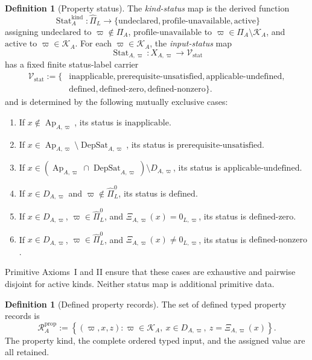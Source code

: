 \documentclass[11pt]{article}
\newcommand{\Pihat}{\widehat{\Pi}_{L}}
\newcommand{\PiZero}{\widehat{\Pi}_{L}^{0}}
\newcommand{\Ap}{\operatorname{Ap}}
\newcommand{\DepSat}{\operatorname{DepSat}}
\newcommand{\Stat}{\operatorname{Stat}}
\newcommand{\PropRec}{\mathcal R^{\mathrm{prop}}}
\theoremstyle{definition}
\newtheorem{definition}[theorem]{Definition}
\theoremstyle{remark}
\begin{document}
\begin{definition}[Property status]
\label{def:status}
The \emph{kind-status} map is the derived function
\[
\Stat_A^{\mathrm{kind}}:\Pihat\longrightarrow
\{\mathrm{undeclared},\mathrm{profile\mbox{-}unavailable},\mathrm{active}\}
\]
assigning \(\mathrm{undeclared}\) to \(\varpi\notin\Pi_A\),
\(\mathrm{profile\mbox{-}unavailable}\) to
\(\varpi\in\Pi_A\setminus\mathcal K_A\), and
\(\mathrm{active}\) to \(\varpi\in\mathcal K_A\).
For each \(\varpi\in\mathcal K_A\), the \emph{input-status} map
\[
\Stat_{A,\varpi}:X_{A,\varpi}\longrightarrow
\mathcal V_{\mathrm{stat}}
\]
has a fixed finite status-label carrier
\[
\begin{aligned}
\mathcal V_{\mathrm{stat}}:=\{&
\mathrm{inapplicable},
\mathrm{prerequisite\mbox{-}unsatisfied},
\mathrm{applicable\mbox{-}undefined},\\
&\mathrm{defined},
\mathrm{defined\mbox{-}zero},
\mathrm{defined\mbox{-}nonzero}\}.
\end{aligned}
\]
and is determined by the following mutually exclusive cases:
\begin{enumerate}[label=(\arabic*)]
\item If \(x\notin\Ap_{A,\varpi}\), its status is
\(\mathrm{inapplicable}\).
\item If \(x\in\Ap_{A,\varpi}\setminus\DepSat_{A,\varpi}\),
its status is \(\mathrm{prerequisite\mbox{-}unsatisfied}\).
\item If \(x\in
(\Ap_{A,\varpi}\cap\DepSat_{A,\varpi})\setminus D_{A,\varpi}\),
its status is \(\mathrm{applicable\mbox{-}undefined}\).
\item If \(x\in D_{A,\varpi}\) and
\(\varpi\notin\PiZero\), its status is \(\mathrm{defined}\).
\item If \(x\in D_{A,\varpi}\),
\(\varpi\in\PiZero\), and
\(\Xi_{A,\varpi}(x)=0_{L,\varpi}\), its status is
\(\mathrm{defined\mbox{-}zero}\).
\item If \(x\in D_{A,\varpi}\),
\(\varpi\in\PiZero\), and
\(\Xi_{A,\varpi}(x)\neq0_{L,\varpi}\), its status is
\(\mathrm{defined\mbox{-}nonzero}\).
\end{enumerate}
Primitive Axioms~I and II ensure that these cases are exhaustive
and pairwise disjoint for active kinds. Neither status map is
additional primitive data.
\end{definition}

\begin{definition}[Defined property records]
The set of defined typed property records is
\[
\PropRec_A:=
\left\{
(\varpi,x,z):
\varpi\in\mathcal K_A,
\ x\in D_{A,\varpi},
\ z=\Xi_{A,\varpi}(x)
\right\}.
\]
The property kind, the complete ordered typed input, and the assigned value are all retained.
\end{definition}
\end{document}
